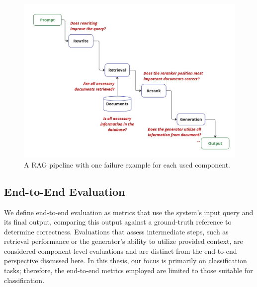 \begin{figure}
  \centering
  \includegraphics[width=\textwidth]{images/FailurePointExamples.pdf}
  \caption{A RAG pipeline with one failure example for each used component.}
  \label{fig:failures}
\end{figure}

\subsection{End-to-End Evaluation}

We define end-to-end evaluation as metrics that use the system's input query and its final output, comparing this output against a ground-truth reference to determine correctness. Evaluations that assess intermediate steps, such as retrieval performance or the generator's ability to utilize provided context, are considered component-level evaluations and are distinct from the end-to-end perspective discussed here. In this thesis, our focus is primarily on classification tasks; therefore, the end-to-end metrics employed are limited to those suitable for classification.

